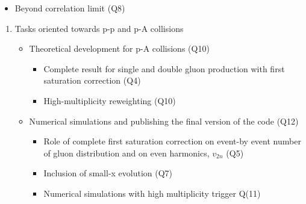 \begin{enumerate}
\begin{enumerate}
\begin{itemize}
\begin{itemize}
                            \item Beyond correlation limit  (Q8)
                        \end{itemize}
                \end{itemize}
        \end{enumerate}
        \begin{enumerate}
            \item  Tasks oriented towards p-p 
				and  p-A  collisions  
                \begin{itemize}
                    \item Theoretical development for p-A collisions (Q10)
                        \begin{itemize}
                            \item Complete result for single and double 
								gluon production with first saturation 
								correction (Q4)
                            \item High-multiplicity reweighting  (Q10)
                        \end{itemize}
                    \item Numerical simulations and publishing the final version 
					of the 	code (Q12)
                        \begin{itemize}
                            \item Role of complete first saturation correction on 
								event-by event number of gluon distribution 
								and on even harmonics, $v_{2n}$ (Q5)
                            \item Inclusion of small-x evolution  (Q7)
                            \item Numerical simulations with
								high multiplicity trigger Q(11)
                        \end{itemize}
                \end{itemize}
        \end{enumerate}


\end{enumerate}
